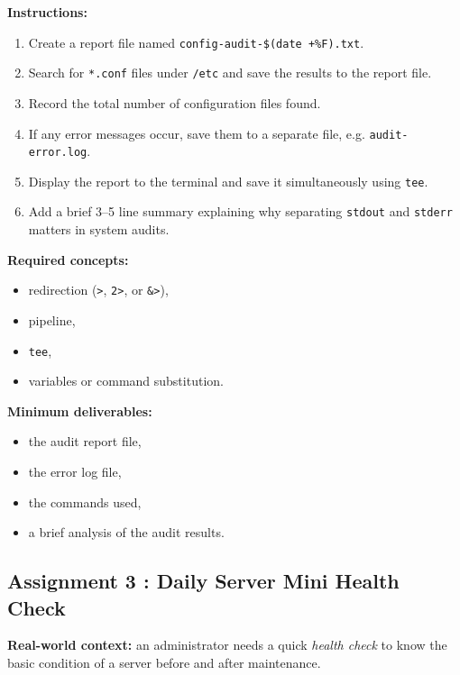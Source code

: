 \textbf{Instructions:}
\begin{enumerate}
  \item Create a report file named
    \texttt{config-audit-\$(date +\%F).txt}.
  \item Search for \texttt{*.conf} files under \texttt{/etc} and save the
    results to the report file.
  \item Record the total number of configuration files found.
  \item If any error messages occur, save them to a separate file, e.g.
    \texttt{audit-error.log}.
  \item Display the report to the terminal and save it simultaneously using
    \texttt{tee}.
  \item Add a brief 3--5 line summary explaining why separating
    \texttt{stdout} and \texttt{stderr} matters in system audits.
\end{enumerate}

\textbf{Required concepts:}
\begin{itemize}
  \item redirection (\texttt{>}, \texttt{2>}, or \texttt{\&>}),
  \item pipeline,
  \item \texttt{tee},
  \item variables or command substitution.
\end{itemize}

\textbf{Minimum deliverables:}
\begin{itemize}
  \item the audit report file,
  \item the error log file,
  \item the commands used,
  \item a brief analysis of the audit results.
\end{itemize}

\subsection*{Assignment 3 : Daily Server Mini Health Check}
\textbf{Real-world context:} an administrator needs a quick \textit{health
check} to know the basic condition of a server before and after maintenance.

